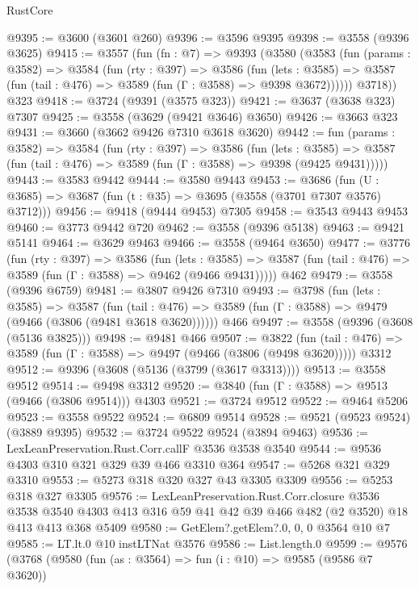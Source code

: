 \begin{lexlean}{RustCore}
\begin{coremodule}
@9395 := @3600 (@3601 @260)
@9396 := @3596 @9395
@9398 := @3558 (@9396 @3625)
@9415 := @3557
    (fun (fn : @7) =>
    @9393
      (@3580
        (@3583
          (fun (params : @3582) =>
          @3584
            (fun (rty : @397) =>
            @3586
              (fun (lets : @3585) =>
              @3587 (fun (tail : @476) => @3589 (fun (Γ : @3588) => @9398 @3672))))))
        @3718))
    @323
@9418 := @3724 (@9391 (@3575 @323))
@9421 := @3637 (@3638 @323) @7307
@9425 := @3558 (@3629 (@9421 @3646) @3650)
@9426 := @3663 @323
@9431 := @3660 (@3662 @9426 @7310 @3618 @3620)
@9442 := fun (params : @3582) =>
  @3584
    (fun (rty : @397) =>
    @3586
      (fun (lets : @3585) =>
      @3587 (fun (tail : @476) => @3589 (fun (Γ : @3588) => @9398 (@9425 @9431)))))
@9443 := @3583 @9442
@9444 := @3580 @9443
@9453 := @3686 (fun (U : @3685) => @3687 (fun (t : @35) => @3695 (@3558 (@3701 @7307 @3576) @3712)))
@9456 := @9418 (@9444 @9453) @7305
@9458 := @3543 @9443 @9453
@9460 := @3773 @9442 @720
@9462 := @3558 (@9396 @5138)
@9463 := @9421 @5141
@9464 := @3629 @9463
@9466 := @3558 (@9464 @3650)
@9477 := @3776
    (fun (rty : @397) =>
    @3586
      (fun (lets : @3585) =>
      @3587 (fun (tail : @476) => @3589 (fun (Γ : @3588) => @9462 (@9466 @9431)))))
    @462
@9479 := @3558 (@9396 @6759)
@9481 := @3807 @9426 @7310
@9493 := @3798
    (fun (lets : @3585) =>
    @3587
      (fun (tail : @476) => @3589 (fun (Γ : @3588) => @9479 (@9466 (@3806 (@9481 @3618 @3620))))))
    @466
@9497 := @3558 (@9396 (@3608 (@5136 @3825)))
@9498 := @9481 @466
@9507 := @3822
    (fun (tail : @476) => @3589 (fun (Γ : @3588) => @9497 (@9466 (@3806 (@9498 @3620)))))
    @3312
@9512 := @9396 (@3608 (@5136 (@3799 (@3617 @3313))))
@9513 := @3558 @9512
@9514 := @9498 @3312
@9520 := @3840 (fun (Γ : @3588) => @9513 (@9466 (@3806 @9514))) @4303
@9521 := @3724 @9512
@9522 := @9464 @5206
@9523 := @3558 @9522
@9524 := @6809 @9514
@9528 := @9521 (@9523 @9524) (@3889 @9395)
@9532 := @3724 @9522 @9524 (@3894 @9463)
@9536 := LexLeanPreservation.Rust.Corr.callF @3536 @3538 @3540
@9544 := @9536 @4303 @310 @321 @329 @39 @466 @3310 @364
@9547 := @5268 @321 @329 @3310
@9553 := @5273 @318 @320 @327 @43 @3305 @3309
@9556 := @5253 @318 @327 @3305
@9576 := LexLeanPreservation.Rust.Corr.closure
    @3536
    @3538
    @3540
    @4303
    @413
    @316
    @59
    @41
    @42
    @39
    @466
    @482
    (@2 @3520)
    @18
    @413
    @413
    @368
    @5409
@9580 := GetElem?.getElem?.{0, 0, 0} @3564 @10 @7
@9585 := LT.lt.{0} @10 instLTNat @3576
@9586 := List.length.{0}
@9599 := @9576
    (@3768
      (@9580
        (fun (as : @3564) => fun (i : @10) => @9585 (@9586 @7 @3620))

\end{coremodule}
\end{lexlean}
